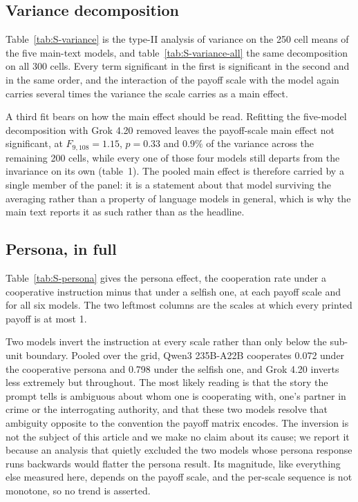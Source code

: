 \documentclass[11pt,a4paper]{article}
\begin{document}
\subsection{Variance decomposition}\label{appendix:variance}

Table~\ref{tab:S-variance} is the type-II analysis of variance on the 250 cell means of the five main-text models, and table~\ref{tab:S-variance-all} the same decomposition on all 300 cells. Every term significant in the first is significant in the second and in the same order, and the interaction of the payoff scale with the model again carries several times the variance the scale carries as a main effect.

A third fit bears on how the main effect should be read. Refitting the five-model decomposition with Grok 4.20 removed leaves the payoff-scale main effect not significant, at $F_{9,108} = 1.15$, $p = 0.33$ and $0.9\%$ of the variance across the remaining 200 cells, while every one of those four models still departs from the invariance on its own (table~1). The pooled main effect is therefore carried by a single member of the panel: it is a statement about that model surviving the averaging rather than a property of language models in general, which is why the main text reports it as such rather than as the headline.

\subsection{Persona, in full}\label{appendix:persona_full}

Table~\ref{tab:S-persona} gives the persona effect, the cooperation rate under a cooperative instruction minus that under a selfish one, at each payoff scale and for all six models. The two leftmost columns are the scales at which every printed payoff is at most 1.

Two models invert the instruction at every scale rather than only below the sub-unit boundary. Pooled over the grid, Qwen3 235B-A22B cooperates 0.072 under the cooperative persona and 0.798 under the selfish one, and Grok 4.20 inverts less extremely but throughout. The most likely reading is that the story the prompt tells is ambiguous about whom one is cooperating with, one's partner in crime or the interrogating authority, and that these two models resolve that ambiguity opposite to the convention the payoff matrix encodes. The inversion is not the subject of this article and we make no claim about its cause; we report it because an analysis that quietly excluded the two models whose persona response runs backwards would flatter the persona result. Its magnitude, like everything else measured here, depends on the payoff scale, and the per-scale sequence is not monotone, so no trend is asserted.
\end{document}
